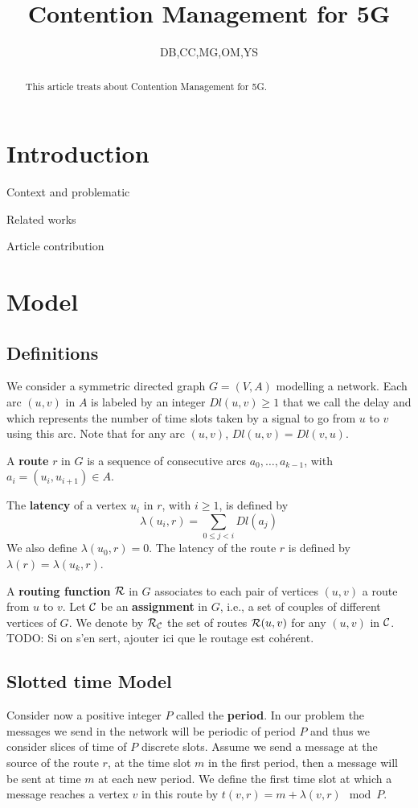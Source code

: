 \documentclass[a4paper,10pt]{article}
\title{Contention Management for 5G}
\author{DB,CC,MG,OM,YS}
\newcommand{\todo}[1]{{\color{red} TODO: {#1}}}
\begin{document}
\maketitle

\begin{abstract}
This article treats about Contention Management for 5G.
\end{abstract}

\section{Introduction}
  \itemize
    \item Context and problematic
    \item Related works
    \item Article contribution

\section{Model}

  \subsection{Definitions}
  
	We consider a symmetric directed graph $G=(V,A)$ modelling a network. Each arc  $(u,v)$ in $A$ is labeled by an integer $Dl(u,v) \geq 1$ that we call the delay and
	which represents the number of time slots taken by a signal to go from $u$ to $v$ using this arc. Note that for any arc $(u,v)$, $Dl(u,v)=Dl(v,u)$.
	
      A {\bf route} $r$ in $G$ is a sequence of consecutive arcs $a_0, \ldots , a_{k-1}$, with $a_i=(u_i,u_{i+1}) \in A$. 
      
      The {\bf latency} of a vertex $u_i$ in $r$, with $i \geq 1$, is defined by $$\lambda(u_i,r)= \sum\limits_{0 \leq j <i} Dl(a_j)$$ We also define $\lambda(u_0,r)=0$.
      The latency of the route $r$ is defined by $\lambda (r)= \lambda (u_k,r)$.
      
      A {\bf routing function} $\cal R$ in $G$ associates to each pair of vertices $(u,v)$ a route from $u$ to $v$. Let $\cal C$ be an {\bf assignment} in $G$, i.e., a set of couples of different vertices of $G$. We denote by $\cal R_{\cal C}$ the set of routes ${\cal R}(u,v)$ for any $(u,v)$ in $\cal C$. \todo{Si on s'en sert, ajouter ici que le routage est cohérent.}

   \subsection{Slotted time Model}
      Consider now a positive integer $P$ called the {\bf period}. In our problem the messages we send in the network will be periodic of period $P$ and thus we consider slices of time of $P$ discrete slots. Assume we send a message at the source of the route $r$,
      at the time slot $m$ in the first period, then a message will be sent at time $m$ at each new period. We define the first time slot at which a message reaches a vertex $v$ in this route by $t(v,r) = m + \lambda(v,r) \mod P$. 
\end{document}
